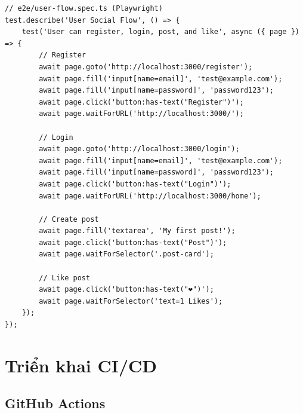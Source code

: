 \begin{verbatim}
// e2e/user-flow.spec.ts (Playwright)
test.describe('User Social Flow', () => {
    test('User can register, login, post, and like', async ({ page }) => {
        // Register
        await page.goto('http://localhost:3000/register');
        await page.fill('input[name=email]', 'test@example.com');
        await page.fill('input[name=password]', 'password123');
        await page.click('button:has-text("Register")');
        await page.waitForURL('http://localhost:3000/');
        
        // Login
        await page.goto('http://localhost:3000/login');
        await page.fill('input[name=email]', 'test@example.com');
        await page.fill('input[name=password]', 'password123');
        await page.click('button:has-text("Login")');
        await page.waitForURL('http://localhost:3000/home');
        
        // Create post
        await page.fill('textarea', 'My first post!');
        await page.click('button:has-text("Post")');
        await page.waitForSelector('.post-card');
        
        // Like post
        await page.click('button:has-text("❤️")');
        await page.waitForSelector('text=1 Likes');
    });
});
\end{verbatim}

\section{Triển khai CI/CD}

\subsection{GitHub Actions}

